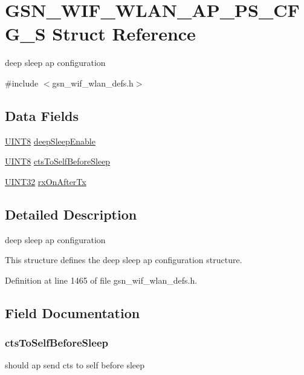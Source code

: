 \hypertarget{a00368}{
\section{GSN\_\-WIF\_\-WLAN\_\-AP\_\-PS\_\-CFG\_\-S Struct Reference}
\label{a00368}
}


deep sleep ap configuration  




{\ttfamily \#include $<$gsn\_\-wif\_\-wlan\_\-defs.h$>$}

\subsection*{Data Fields}
\begin{DoxyCompactItemize}
\item 
\hyperlink{a00660_gab27e9918b538ce9d8ca692479b375b6a}{UINT8} \hyperlink{a00368_a15a109bea71602dc845f3747d938b556}{deepSleepEnable}
\item 
\hyperlink{a00660_gab27e9918b538ce9d8ca692479b375b6a}{UINT8} \hyperlink{a00368_ace347ef7a99d2ae30b6e9c55015042a7}{ctsToSelfBeforeSleep}
\item 
\hyperlink{a00660_gae1e6edbbc26d6fbc71a90190d0266018}{UINT32} \hyperlink{a00368_a508b8ee456028ea3adfeb6b9fdda72e9}{rxOnAfterTx}
\end{DoxyCompactItemize}


\subsection{Detailed Description}
deep sleep ap configuration 

This structure defines the deep sleep ap configuration structure. 

Definition at line 1465 of file gsn\_\-wif\_\-wlan\_\-defs.h.



\subsection{Field Documentation}
\hypertarget{a00368_ace347ef7a99d2ae30b6e9c55015042a7}{
\subsubsection[{ctsToSelfBeforeSleep}]{ {\bf ctsToSelfBeforeSleep}}}
\label{a00368_ace347ef7a99d2ae30b6e9c55015042a7}
should ap send cts to self before sleep 

